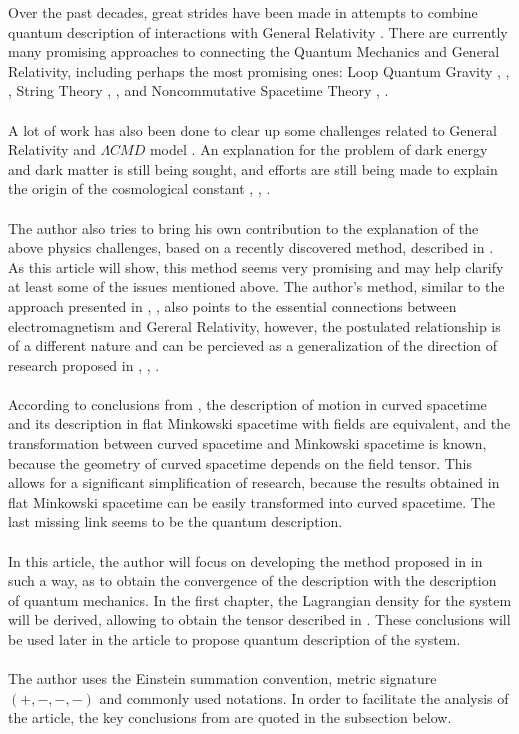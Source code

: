 \documentclass[aps,prx,preprint,groupedaddress,showkeys]{revtex4-2}
\begin{document}
Over the past decades, great strides have been made in attempts to combine quantum description of interactions with General Relativity \cite{INT1}. There are currently many promising approaches to connecting the Quantum Mechanics and General Relativity, including perhaps the most promising ones: Loop Quantum Gravity \cite{LQG1}, \cite{LQG2}, \cite{LQG3}, String Theory \cite{ST1}, \cite{ST2}, \cite{ST3} and Noncommutative Spacetime Theory \cite{NS1}, \cite{NS2}. \\
~\\
A lot of work has also been done to clear up some challenges related to General Relativity and $\Lambda CMD$ model \cite{LCMD}. An explanation for the problem of dark energy \cite{DE1} and dark matter \cite{DM1} is still being sought, and efforts are still being made to explain the origin of the cosmological constant  \cite{CC1}, \cite{CC2}, \cite{CC3}.\\
~\\
The author also tries to bring his own contribution to the explanation of the above physics challenges, based on a recently discovered method, described in \cite{PMofC}. As this article will show, this method seems very promising and may help clarify at least some of the issues mentioned above. The author's method, similar to the approach presented in \cite{DFF}, \cite{LLM}, \cite{GEM1} also points to the essential connections between electromagnetism and Gereral Relativity, however, the postulated relationship is of a different nature and can be percieved as a generalization of the direction of research proposed in \cite{VGRA}, \cite{PGRA}, \cite{AGRA}.\\
~\\
According to conclusions from \cite{PMofC}, the description of motion in curved spacetime and its description in flat Minkowski spacetime with fields are equivalent, and the transformation between curved spacetime and Minkowski spacetime is known, because the geometry of curved spacetime depends on the field tensor. This allows for a significant simplification of research, because the results obtained in flat Minkowski spacetime can be easily transformed into curved spacetime. The last missing link seems to be the quantum description.\\
~\\
In this article, the author will focus on developing the method proposed in \cite{PMofC} in such a way, as to obtain the convergence of the description with the description of quantum mechanics. In the first chapter, the Lagrangian density for the system will be derived, allowing to obtain the tensor described in \cite{PMofC}. These conclusions will be used later in the article to propose quantum description of the system.\\
~\\ 
The author uses the Einstein summation convention, metric signature $(+,-,-,-)$ and commonly used notations. In order to facilitate the analysis of the article, the key conclusions from \cite{PMofC} are quoted in the subsection below. 
\end{document}
